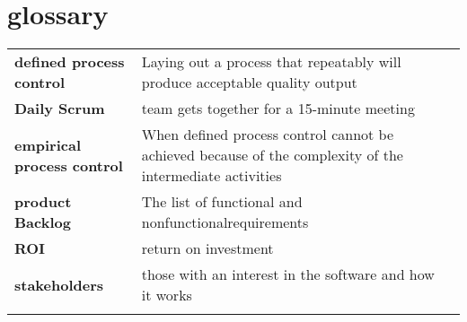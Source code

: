 \section*{glossary}

\begin{table}[H]
  \begin{tabular}{lll}
    \textbf{defined process control} &  Laying out a process that repeatably will produce acceptable quality output\\
    \textbf{Daily Scrum} &  team gets together for a 15-minute meeting\\
    \textbf{empirical process control} &  When defined process control cannot be achieved because of the complexity of the intermediate activities\\
    \textbf{product Backlog} & The list of functional
    and nonfunctionalrequirements\\
    \textbf{ROI} &  return on investment\\
    \textbf{stakeholders} &  those with an interest in the software and how it works\\
   & 
  \end{tabular}
\end{table}